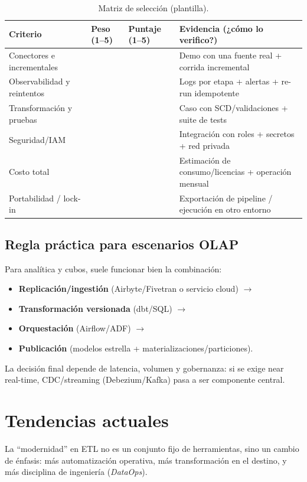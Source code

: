 \documentclass[12pt]{article}
\begin{document}
\begin{longtable}{@{}p{4.0cm}p{2.3cm}p{2.3cm}p{6.0cm}@{}}
\caption{Matriz de selección (plantilla).}\label{tab:matriz}\\
\toprule
\textbf{Criterio} & \textbf{Peso (1--5)} & \textbf{Puntaje (1--5)} & \textbf{Evidencia (¿cómo lo verifico?)} \\
\midrule
Conectores e incrementales &  &  & Demo con una fuente real + corrida incremental \\
Observabilidad y reintentos &  &  & Logs por etapa + alertas + re-run idempotente \\
Transformación y pruebas &  &  & Caso con SCD/validaciones + suite de tests \\
Seguridad/IAM &  &  & Integración con roles + secretos + red privada \\
Costo total &  &  & Estimación de consumo/licencias + operación mensual \\
Portabilidad / lock-in &  &  & Exportación de pipeline / ejecución en otro entorno \\
\bottomrule
\end{longtable}

\subsection{Regla práctica para escenarios OLAP}
Para analítica y cubos, suele funcionar bien la combinación:
\begin{itemize}[leftmargin=*]
  \item \textbf{Replicación/ingestión} (Airbyte/Fivetran o servicio cloud) $\rightarrow$
  \item \textbf{Transformación versionada} (dbt/SQL) $\rightarrow$
  \item \textbf{Orquestación} (Airflow/ADF) $\rightarrow$
  \item \textbf{Publicación} (modelos estrella + materializaciones/particiones).
\end{itemize}
La decisión final depende de latencia, volumen y gobernanza: si se exige near real-time, CDC/streaming (Debezium/Kafka) pasa a ser componente central.

\section{Tendencias actuales}
La “modernidad” en ETL no es un conjunto fijo de herramientas, sino un cambio de énfasis: más automatización operativa, más transformación en el destino, y más disciplina de ingeniería (\textit{DataOps}).
\end{document}
